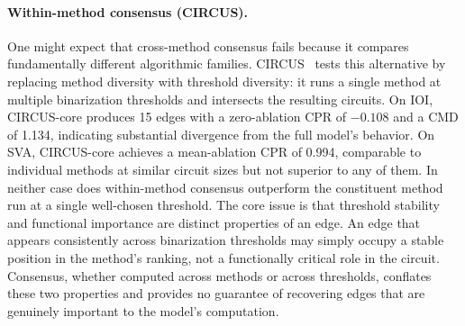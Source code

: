 \paragraph{Within-method consensus (CIRCUS).}
One might expect that cross-method consensus fails because it compares fundamentally different algorithmic families.
CIRCUS~\cite{parekh2026circus} tests this alternative by replacing method diversity with threshold diversity: it runs a single method at multiple binarization thresholds and intersects the resulting circuits.
On IOI, CIRCUS-core produces 15 edges with a zero-ablation CPR of $-0.108$ and a CMD of 1.134, indicating substantial divergence from the full model's behavior.
On SVA, CIRCUS-core achieves a mean-ablation CPR of 0.994, comparable to individual methods at similar circuit sizes but not superior to any of them.
In neither case does within-method consensus outperform the constituent method run at a single well-chosen threshold.
The core issue is that threshold stability and functional importance are distinct properties of an edge.
An edge that appears consistently across binarization thresholds may simply occupy a stable position in the method's ranking, not a functionally critical role in the circuit.
Consensus, whether computed across methods or across thresholds, conflates these two properties and provides no guarantee of recovering edges that are genuinely important to the model's computation.
